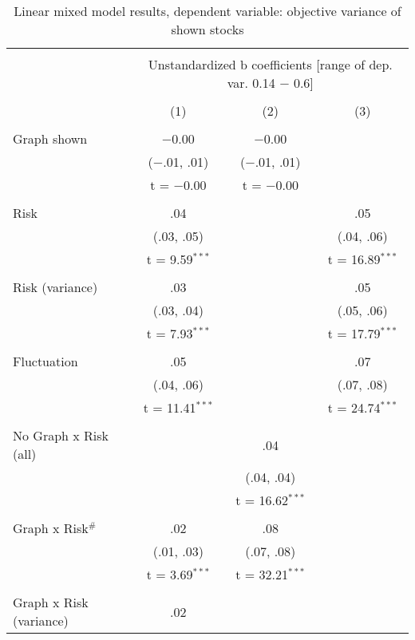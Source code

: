 
\begin{table}[!htbp] \centering 
  \caption{Linear mixed model results, dependent variable: objective variance of shown stocks} 
  \label{table:supplement_tab1} 
\begin{tabular}{@{\extracolsep{5pt}}lccc} 
\\[-1.8ex]\hline 
\hline \\[-1.8ex] 
 & \multicolumn{3}{c}{Unstandardized b coefficients [range of dep. var. 0.14 $-$ 0.6]} \\ 
\cline{2-4} 
\\[-1.8ex] & (1) & (2) & (3)\\ 
\hline \\[-1.8ex] 
 Graph shown & $-$0.00 & $-$0.00 &  \\ 
  & ($-$.01, .01) & ($-$.01, .01) &  \\ 
  & t = $-$0.00 & t = $-$0.00 &  \\ 
  & & & \\ 
 Risk & .04 &  & .05 \\ 
  & (.03, .05) &  & (.04, .06) \\ 
  & t = 9.59$^{***}$ &  & t = 16.89$^{***}$ \\ 
  & & & \\ 
 Risk (variance) & .03 &  & .05 \\ 
  & (.03, .04) &  & (.05, .06) \\ 
  & t = 7.93$^{***}$ &  & t = 17.79$^{***}$ \\ 
  & & & \\ 
 Fluctuation & .05 &  & .07 \\ 
  & (.04, .06) &  & (.07, .08) \\ 
  & t = 11.41$^{***}$ &  & t = 24.74$^{***}$ \\ 
  & & & \\ 
 No Graph x Risk (all) &  & .04 &  \\ 
  &  & (.04, .04) &  \\ 
  &  & t = 16.62$^{***}$ &  \\ 
  & & & \\ 
 Graph x Risk$^{\#}$ & .02 & .08 &  \\ 
  & (.01, .03) & (.07, .08) &  \\ 
  & t = 3.69$^{***}$ & t = 32.21$^{***}$ &  \\ 
  & & & \\ 
 Graph x Risk (variance) & .02 &  &  \\ 

\end{tabular}
\end{table}
